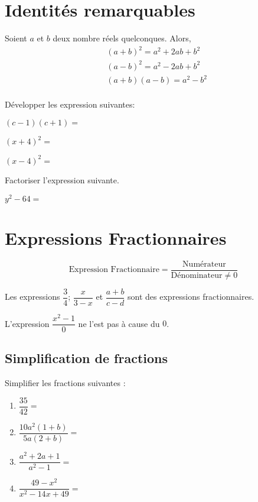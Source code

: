 \documentclass{poly}
\begin{document}
\section{Identités remarquables}
\begin{proposition}
Soient $a$ et $b$ deux nombre réels quelconques. Alors,
\begin{equation*}
\begin{aligned}
&(a + b)^2 = a^2 + 2ab + b^2\\ 
&(a - b)^2 = a^2 - 2ab + b^2\\ 
&(a + b)(a - b) = a^2 - b^2\\ 
\end{aligned}
\end{equation*}
\end{proposition}
\begin{example}
Développer les expression suivantes:
\begin{alphaquestions}
\item $(c-1)(c+1)=$ \answerline
\item $(x+4)^2=$ \answerline
\item $(x-4)^2=$ \answerline
\end{alphaquestions}    
\end{example}
\vspace*{0.5cm}
\begin{example}
Factoriser l'expression suivante. 

$y^2 - 64 =$ \answerline
\end{example}
\newpage
\section{Expressions Fractionnaires}
\begin{definition}
\begin{equation*}
\text{Expression Fractionnaire} = \dfrac{\text{Numérateur}}{\text{Dénominateur} \neq 0}
\end{equation*}
\end{definition}
\begin{example}

Les expressions $\dfrac{3}{4}$; $\dfrac{x}{3-x}$ et $\dfrac{a + b}{c - d}$ sont des expressions fractionnaires.

L'expression $\dfrac{x^2 - 1}{0}$ ne l'est pas à cause du $0$.
\end{example}

\subsection{Simplification de fractions}
\begin{example}
Simplifier les fractions suivantes :
\begin{enumerate}[label=\emph{\alph*})]
\item $\dfrac{35}{42} =$  \answerline
\item $\dfrac{10a^2(1 + b)}{5a(2 + b)} = $ \answerline
\item $\dfrac{a^2 + 2a + 1}{a^2 - 1} =$ \answerline
\item $\dfrac{49 - x^2}{x^2-14x+49} =$ \answerline
\end{enumerate}
\end{example}
\end{document}
